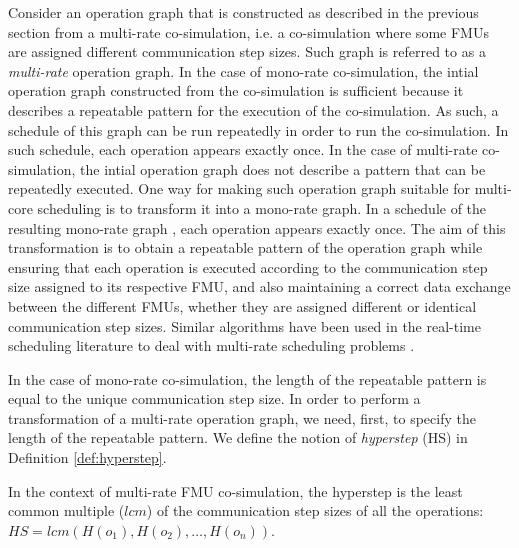 Consider an operation graph that is constructed as described in the previous section from a multi-rate co-simulation, i.e. a co-simulation where some FMUs are assigned different communication step sizes. Such graph is referred to as a \textit{multi-rate} operation graph. In the case of mono-rate co-simulation, the intial operation graph constructed from the co-simulation is sufficient because it describes a repeatable pattern for the execution of the co-simulation. As such, a schedule of this graph can be run repeatedly in order to run the co-simulation. In such schedule, each operation appears exactly once. In the case of multi-rate co-simulation, the intial operation graph does not describe a pattern that can be repeatedly executed. One way for making such operation graph suitable for multi-core scheduling is to transform it into a mono-rate graph. In a schedule of the resulting mono-rate graph , each operation appears exactly once. The aim of this transformation is to obtain a repeatable pattern of the operation graph while ensuring that each operation is executed according to the communication step size assigned to its respective FMU, and also maintaining a correct data exchange between the different FMUs, whether they are assigned different or identical communication step sizes. Similar algorithms have been used in the real-time scheduling literature to deal with multi-rate scheduling problems \cite{kermia:2007, ramamritham:1995}.

In the case of mono-rate co-simulation, the length of the repeatable pattern is equal to the unique communication step size. In order to perform a transformation of a multi-rate operation graph, we need, first, to specify the length of the repeatable pattern. We define the notion of \textit{hyperstep} (HS) in Definition \ref{def:hyperstep}. 

\begin{definition}
In the context of multi-rate FMU co-simulation, the hyperstep is the least common multiple ($lcm$) of the communication step sizes of all the operations: $HS=lcm(H(o_1),H(o_2), \dots ,H(o_n))$.
\label{def:hyperstep}
\end{definition}

